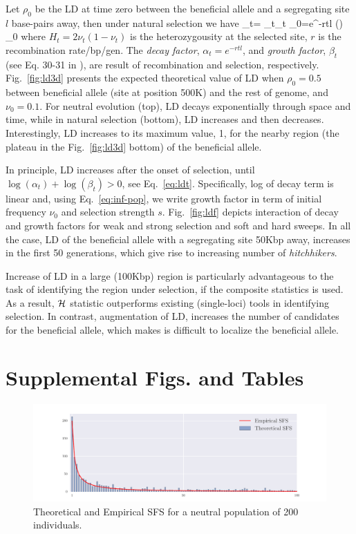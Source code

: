 \documentclass[11pt]{article}
\begin{document}
Let $\rho_0$ be the LD at time zero between the beneficial allele and a 
segregating site $l$ base-pairs away, then under natural selection we have
\beq
\rho_t= \alpha_t\beta_t \rho_0=e^{-rtl} \left(\right)  
\rho_0\label{eq:ldt}
\eeq
where $H_t=2\nu_t(1-\nu_t)$ is the heterozygousity at the selected site, $r$ is 
the recombination rate/bp/gen. The 
\emph{decay factor}, $\alpha_t=e^{-rtl}$,
and \emph{growth factor}, $\beta_t$ (see Eq. 30-31 in 
\cite{Stephan2006The}), are result of recombination and 
selection, respectively. Fig.~\ref{fig:ld3d} presents the expected theoretical 
value of LD when $\rho_0=0.5$ between beneficial allele (site at position 500K) 
and the rest of 
genome, and $\nu_0=0.1$. For neutral evolution (top), LD decays exponentially 
through space and time, while in natural selection (bottom), LD increases and 
then decreases. Interestingly, LD increases to its maximum value, 1, for the 
nearby region (the plateau in the Fig.~\ref{fig:ld3d} bottom) of the beneficial 
allele.

In principle, LD increases after the onset of selection, until $\log(\alpha_t) 
+\log(\beta_t) 
>0$, see Eq.~\ref{eq:ldt}. 
Specifically, log of decay term is linear and, using 
Eq.~\ref{eq:inf-pop}, we write growth 
factor in term of initial frequency $\nu_0$ and selection strength $s$. 
Fig.~\ref{fig:ldf} depicts interaction of decay and growth factors for weak and 
strong selection and soft and hard sweeps. In all the case, LD of the 
beneficial allele with a segregating site 50Kbp away, increases in the first 50 
generations, which give rise to increasing number of \emph{hitchhikers}. 

Increase of LD in a large (100Kbp) region is particularly advantageous to the 
task of identifying the region under selection, if the composite statistics is 
used. As a result, ${\cal H}$ statistic outperforms existing (single-loci) tools in 
identifying selection. In contrast, augmentation of LD, increases the 
number 
of candidates for 
the beneficial allele, which makes is difficult to localize the beneficial 
allele.

\newpage
\section{Supplemental Figs. and Tables}

\begin{figure}[H]
	\centering
	\includegraphics[trim=1in 0.1in 1in 0.1in,clip,width=\textwidth]{figures/sfs.pdf}
	\caption{Theoretical and Empirical SFS for a neutral population of 200 
	individuals.}	\label{fig:sfs}
\end{figure}
\end{document}
